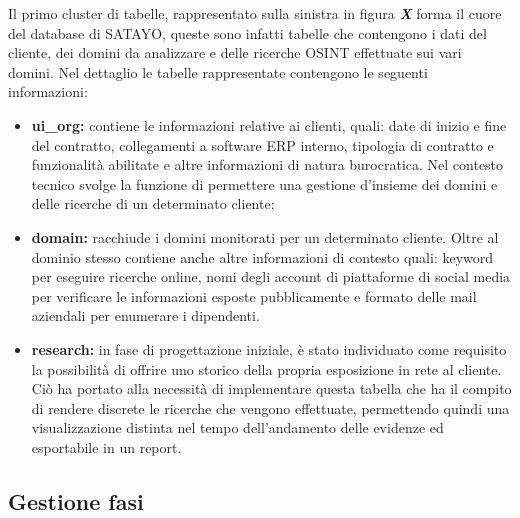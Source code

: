 Il primo cluster di tabelle, rappresentato sulla sinistra in figura \textbf{\textit{X}}
forma il cuore del database di SATAYO, queste sono infatti tabelle che contengono
i dati del cliente, dei domini da analizzare e delle ricerche OSINT effettuate
sui vari domini. Nel dettaglio le tabelle rappresentate contengono le seguenti informazioni:
\begin{itemize}
  \item \textbf{ui\_org:} contiene le informazioni relative ai clienti, quali:
    date di inizio e fine del contratto, collegamenti a software ERP interno,
    tipologia di contratto e funzionalità abilitate e altre informazioni di
    natura burocratica. Nel contesto tecnico svolge la funzione di permettere una
    gestione d'insieme dei domini e delle ricerche di un determinato cliente;

  \item \textbf{domain:} racchiude i domini monitorati per un determinato
    cliente. Oltre al dominio stesso contiene anche altre informazioni di contesto
    quali: keyword per eseguire ricerche online, nomi degli account di piattaforme
    di social media per verificare le informazioni esposte pubblicamente e formato
    delle mail aziendali per enumerare i dipendenti.

  \item \textbf{research:} in fase di progettazione iniziale, è stato individuato
    come requisito la possibilità di offrire uno storico della propria esposizione
    in rete al cliente. Ciò ha portato alla necessità di implementare questa
    tabella che ha il compito di rendere discrete le ricerche che vengono
    effettuate, permettendo quindi una visualizzazione distinta nel tempo dell'andamento
    delle evidenze ed esportabile in un report.
\end{itemize}

\subsection{Gestione fasi}
\label{sub:db:tasks}

